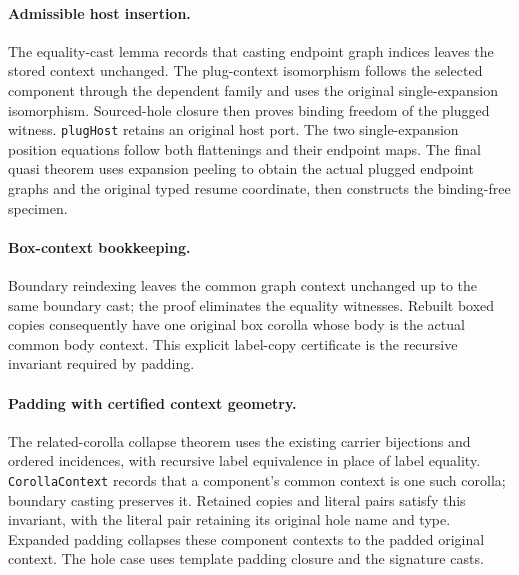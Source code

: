 \paragraph{Admissible host insertion.}
The equality-cast lemma records that casting endpoint graph indices leaves
the stored context unchanged. The plug-context isomorphism follows the
selected component through the dependent family and uses the original
single-expansion isomorphism. Sourced-hole closure then proves binding
freedom of the plugged witness. \texttt{plugHost} retains an original host
port. The two single-expansion position equations follow both flattenings
and their endpoint maps. The final quasi theorem uses expansion peeling
to obtain the actual plugged endpoint graphs and the original typed resume
coordinate, then constructs the binding-free specimen.

\par{}

\paragraph{Box-context bookkeeping.}
Boundary reindexing leaves the common graph context unchanged up to the
same boundary cast; the proof eliminates the equality witnesses. Rebuilt
boxed copies consequently have one original box corolla whose body is the
actual common body context. This explicit label-copy certificate is the
recursive invariant required by padding.


\paragraph{Padding with certified context geometry.}
The related-corolla collapse theorem uses the existing carrier bijections
and ordered incidences, with recursive label equivalence in place of label
equality. \texttt{CorollaContext} records that a component's common context
is one such corolla; boundary casting preserves it. Retained copies and
literal pairs satisfy this invariant, with the literal pair retaining its
original hole name and type. Expanded padding collapses these component
contexts to the padded original context. The hole case uses template
padding closure and the signature casts.

